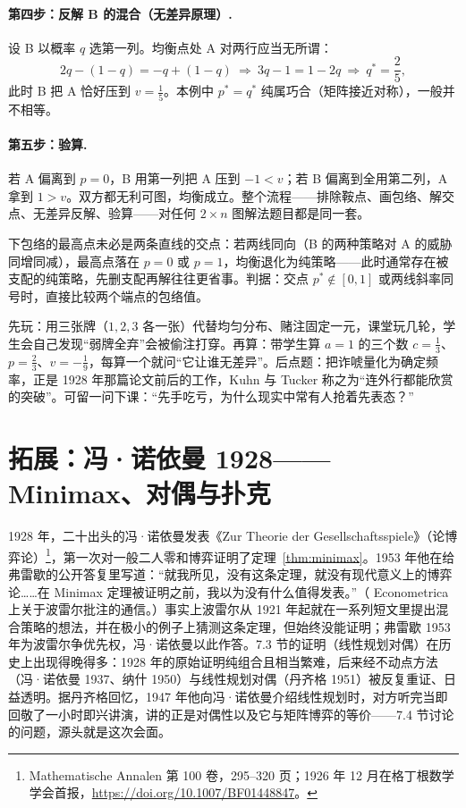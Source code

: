 \documentclass[UTF8,a4paper,11pt,oneside,openany,fontset=fandol]{ctexbook}
\theoremstyle{definition}
\begin{document}
\paragraph{第四步：反解 B 的混合（无差异原理）.} 设 B 以概率 $q$ 选第一列。均衡点处 A 对两行应当无所谓：
\[
 2q-(1-q)=-q+(1-q)\ \Longrightarrow\ 3q-1=1-2q\ \Longrightarrow\ q^{*}=\frac25,
\]
此时 B 把 A 恰好压到 $v=\tfrac15$。本例中 $p^{*}=q^{*}$ 纯属巧合（矩阵接近对称），一般并不相等。

\paragraph{第五步：验算.} 若 A 偏离到 $p=0$，B 用第一列把 A 压到 $-1<v$；若 B 偏离到全用第二列，A 拿到 $1>v$。双方都无利可图，均衡成立。整个流程——排除鞍点、画包络、解交点、无差异反解、验算——对任何 $2\times n$ 图解法题目都是同一套。

\begin{pitfall}
下包络的最高点未必是两条直线的交点：若两线同向（B 的两种策略对 A 的威胁同增同减），最高点落在 $p=0$ 或 $p=1$，均衡退化为纯策略——此时通常存在被支配的纯策略，先删支配再解往往更省事。判据：交点 $p^{*}\notin[0,1]$ 或两线斜率同号时，直接比较两个端点的包络值。
\end{pitfall}

\begin{teach}[扑克模型的三步讲法]
先玩：用三张牌（$1,2,3$ 各一张）代替均匀分布、赌注固定一元，课堂玩几轮，学生会自己发现“弱牌全弃”会被偷注打穿。再算：带学生算 $a=1$ 的三个数 $c=\tfrac13$、$p=\tfrac23$、$v=-\tfrac19$，每算一个就问“它让谁无差异”。后点题：把诈唬量化为确定频率，正是 1928 年那篇论文前后的工作，Kuhn 与 Tucker 称之为“连外行都能欣赏的突破”。可留一问下课：“先手吃亏，为什么现实中常有人抢着先表态？”
\end{teach}
\section{拓展：冯·诺依曼 1928——Minimax、对偶与扑克}
1928 年，二十出头的冯·诺依曼发表《Zur Theorie der Gesellschaftsspiele》（论博弈论）\footnote{Mathematische Annalen 第 100 卷，295--320 页；1926 年 12 月在格丁根数学学会首报，\url{https://doi.org/10.1007/BF01448847}。}，第一次对一般二人零和博弈证明了定理~\ref{thm:minimax}。1953 年他在给弗雷歇的公开答复里写道：“就我所见，没有这条定理，就没有现代意义上的博弈论……在 Minimax 定理被证明之前，我以为没有什么值得发表。”（ Econometrica 上关于波雷尔批注的通信。）事实上波雷尔从 1921 年起就在一系列短文里提出混合策略的想法，并在极小的例子上猜测这条定理，但始终没能证明；弗雷歇 1953 年为波雷尔争优先权，冯·诺依曼以此作答。7.3 节的证明（线性规划对偶）在历史上出现得晚得多：1928 年的原始证明纯组合且相当繁难，后来经不动点方法（冯·诺依曼 1937、纳什 1950）与线性规划对偶（丹齐格 1951）被反复重证、日益透明。据丹齐格回忆，1947 年他向冯·诺依曼介绍线性规划时，对方听完当即回敬了一小时即兴讲演，讲的正是对偶性以及它与矩阵博弈的等价——7.4 节讨论的问题，源头就是这次会面。
\end{document}
